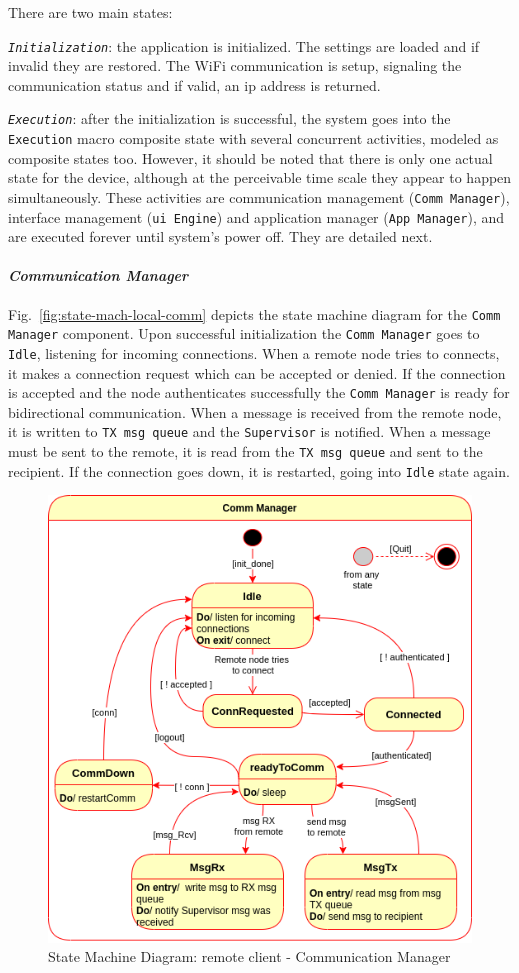 There are two main states:
\begin{item-c}
\item \emph{\texttt{Initialization}}: the application is initialized. The
  settings are loaded and if invalid they are restored. The WiFi communication
  is setup, signaling the communication status and if valid, an \gls{ip} address
  is returned.
\item \emph{\texttt{Execution}}: after the initialization is successful, the system goes into the \texttt{Execution} macro composite state with several concurrent activities, modeled as composite states too. However, it should be noted that there is only one actual state for the device, although at the perceivable time scale they appear to happen simultaneously. These activities are communication management (\texttt{Comm Manager}), interface management (\texttt{\gls{ui} Engine}) and application manager (\texttt{App Manager}), and are executed forever until system's power off. They are detailed next.
\end{item-c}
%
\paragraph{\emph{Communication Manager}}
Fig.~\ref{fig:state-mach-local-comm} depicts the state machine diagram for the
\texttt{Comm Manager} component. Upon successful initialization the
\texttt{Comm Manager} goes to \texttt{Idle}, listening for incoming
connections. When a remote node tries to connects, it makes a connection request
which can be accepted or denied. If the connection is accepted and the node
authenticates successfully the \texttt{Comm Manager} is ready for bidirectional
communication. When a message is received from the remote node, it is written to
\texttt{TX msg queue} and the \texttt{Supervisor} is notified. When a message
must be sent to the remote, it is read from the \texttt{TX msg queue} and sent
to the recipient. If the connection goes down, it is restarted, going into
\texttt{Idle} state again.

\begin{figure}[htb!]
\centering
    \includegraphics[width=0.5\columnwidth]{./img/state-mach-rc-comm.png}
  \caption{State Machine Diagram: remote client - Communication Manager}%
\label{fig:state-mach-rc-comm}
\end{figure}
%

